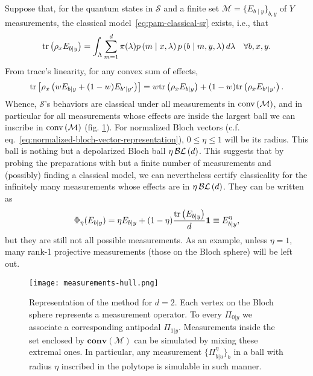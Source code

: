         Suppose that, for the quantum states in $\mathcal{S}$ and a finite set $\mathcal{M} = \{ E_{b \mid y} \}_{b,y}$ of $Y$ measurements, the classical model~\eqref{eq:pam-classical-sr} exists, i.e., that
        \begin{equation}
            \text{tr}\left( \rho_x E_{b\mid y} \right) = \int_{\Lambda} \sum_{m = 1}^{d} \pi(\lambda) p \left( m \mid x,\lambda \right) p \left( b \mid m,y,\lambda \right) d\lambda \quad\forall b,x,y .
        \label{eq:quantum-classicality-model}
        \end{equation}
        From trace's linearity, for any convex sum of effects,
        \begin{equation*}
            \text{tr}\left[ \rho_x \left( w E_{b\mid y} + (1-w) E_{b^\prime \mid y^\prime} \right) \right] = w\text{tr}\left( \rho_x E_{b\mid y} \right) + (1-w) \text{tr}\left( \rho_x E_{b^\prime \mid y^\prime} \right) .
        \end{equation*}
        Whence, $\mathcal{S}$'s behaviors are classical under all measurements in $\text{conv} \left( \mathcal{M} \right)$, and in particular for all measurements whose effects are inside the largest ball we can inscribe in $\text{conv} \left( \mathcal{M} \right)$ (fig. \ref{fig:measurements-hull}). For normalized Bloch vectors (c.f. eq.~\eqref{eq:normalized-bloch-vector-representation}), $0 \leq \eta \leq 1$ will be its radius. This ball is nothing but a depolarized Bloch ball $\eta \, \mathcal{BL}\left( d \right)$. This suggests that by probing the preparations with but a finite number of measurements and (possibly) finding a classical model, we can nevertheless certify classicality for the infinitely many measurements whose effects are in $\eta \, \mathcal{BL}\left( d \right)$. They can be written as
        \begin{equation}
            \Phi_\eta(E_{b \mid y}) = \eta E_{b \mid y} + (1 - \eta) \frac{ \text{tr}\left( E_{b \mid y} \right) }{d} \mathbf{1} \equiv E_{b \mid y}^\eta,
            \label{depolarized-measurements}
        \end{equation}
        but they are still not all possible measurements. As an example, unless $\eta = 1$, many rank-1 projective measurements (those on the Bloch sphere) will be left out.

        \begin{figure}
            \centering
            \texttt{[image: measurements-hull.png]}
            \caption{Representation of the method for $d = 2$. Each vertex on the Bloch sphere represents a measurement operator. To every $\Pi_{0 \vert y}$ we associate a corresponding antipodal $\Pi_{1 \vert y}$. Measurements inside the set enclosed by $\textbf{conv}(\mathcal{M})$ can be simulated by mixing these extremal ones. In particular, any measurement $\{ \Pi_{b \vert u}^\eta \}_b$ in a ball with radius $\eta$ inscribed in the polytope is simulable in such manner.}
        \label{fig:measurements-hull}
    \end{figure}

